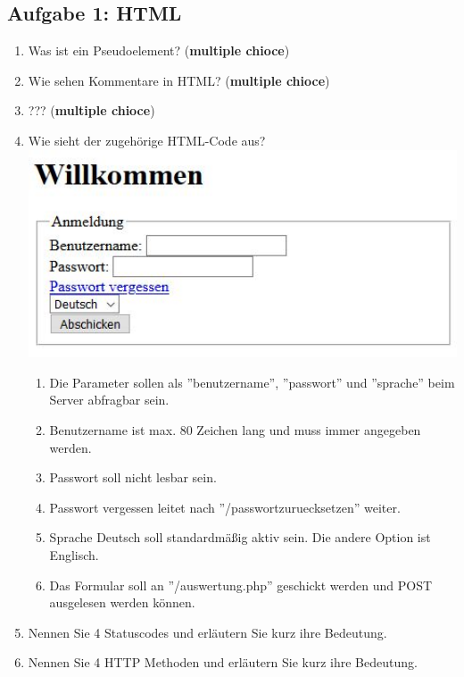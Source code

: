 \subsection{Aufgabe 1: HTML}
\label{sec:Aufgabe1}
\begin{enumerate}[label=\alph*)]
    \item Was ist ein Pseudoelement? (\textbf{multiple chioce})
    \item Wie sehen Kommentare in HTML? (\textbf{multiple chioce})
    \item ??? (\textbf{multiple chioce})
    \item Wie sieht der zugehörige HTML-Code aus? \\
        \includegraphics[width=15cm]{img/klausur.JPG}
        \begin{enumerate}[label=\arabic*.]
            \item Die Parameter sollen als ''benutzername'', ''passwort'' und
                ''sprache'' beim Server abfragbar sein.
            \item Benutzername ist max. 80 Zeichen lang und muss immer angegeben werden.
            \item Passwort soll nicht lesbar sein.
            \item Passwort vergessen leitet nach ''/passwortzuruecksetzen'' weiter.
            \item Sprache Deutsch soll standardmäßig aktiv sein. Die andere Option
                ist Englisch.
            \item Das Formular soll an ''/auswertung.php'' geschickt werden und
                POST ausgelesen werden können.
         \end{enumerate}
    \item Nennen Sie 4 Statuscodes und erläutern Sie kurz ihre Bedeutung.
    \item Nennen Sie 4 HTTP Methoden und erläutern Sie kurz ihre Bedeutung.
\end{enumerate}

